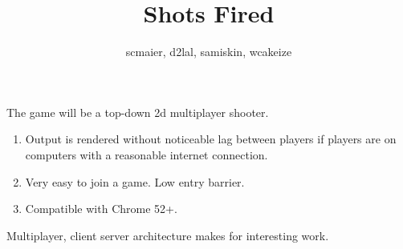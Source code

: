 \documentclass{slides}
\title{Shots Fired}
\author{scmaier, d2lal, samiskin, wcakeize}
\begin{document}
The game will be a top-down 2d multiplayer shooter.
\clearpage


\begin{enumerate}
\item Output is rendered without noticeable lag between players if players are on computers with a reasonable internet connection. 
\item Very easy to join a game. Low entry barrier. 
\item Compatible with Chrome 52+.
\end{enumerate}

\clearpage

Multiplayer, client server architecture makes for interesting work.

\clearpage
\end{document}
